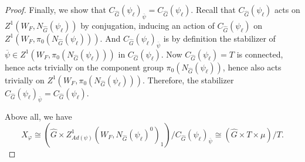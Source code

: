 \begin{theorem}
\begin{proof}
    	Finally, we show that $C_{\hat{G}}(\psi_{\ell})_{\overline{\psi}}=C_{\hat{G}}(\psi_{\ell})$. Recall that $C_{\hat{G}}(\psi_{\ell})$ acts on $Z^1(W_F, N_{\hat{G}}(\psi_{\ell}))$ by conjugation, inducing an action of $C_{\hat{G}}(\psi_{\ell})$ on $Z^1(W_F, \pi_0(N_{\hat{G}}(\psi_{\ell}))).$ And $C_{\hat{G}}(\psi_{\ell})_{\overline{\psi}}$ is by definition the stabilizer of $\overline{\psi} \in Z^1(W_F, \pi_0(N_{\hat{G}}(\psi_{\ell})))$ in $C_{\hat{G}}(\psi_{\ell})$. Now $C_{\hat{G}}(\psi_{\ell})=T$ is connected, hence acts trivially on the component group $\pi_0(N_{\hat{G}}(\psi_{\ell}))$, hence also acts trivially on $Z^1(W_F, \pi_0(N_{\hat{G}}(\psi_{\ell})))$. Therefore, the stabilizer $C_{\hat{G}}(\psi_{\ell})_{\overline{\psi}}=C_{\hat{G}}(\psi_{\ell})$.
    	
    	Above all, we have 
        \begin{equation}
    		X_{\varphi} \cong (\hat{G} \times Z^1_{Ad(\psi)}(W_F, N_{\hat{G}}(\psi_{\ell})^0)_1)/C_{\hat{G}}(\psi_{\ell})_{\overline{\psi}} \cong (\hat{G} \times T \times \mu)/T.
        \end{equation}
    \end{proof}
\end{theorem}

